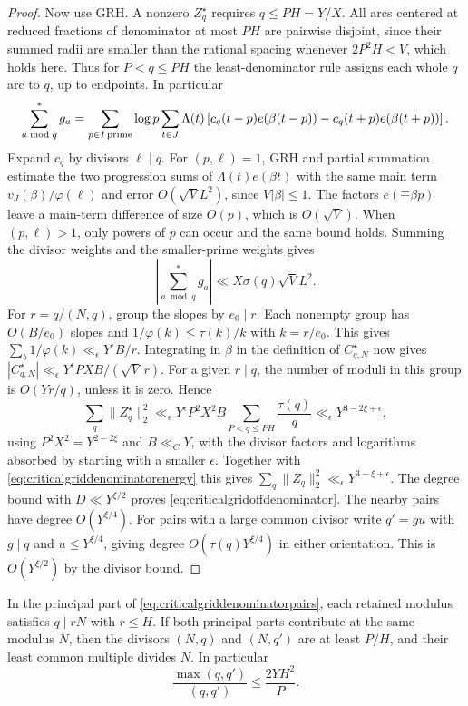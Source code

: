 \documentclass[11pt,a4paper]{article}
\numberwithin{equation}{section}
\begin{document}
\begin{proof}
Now use GRH. A nonzero $Z_q^\star$ requires $q\le PH=Y/X$.
All arcs centered at reduced fractions of denominator
at most $PH$ are pairwise disjoint, since their summed
radii are smaller than the rational spacing whenever
$2P^2H<V$, which holds here. Thus for $P<q\le PH$
the least-denominator rule assigns each whole $q$ arc to
$q$, up to endpoints. In particular
\[
 \sum_{a\bmod q}^{*}g_a
  =\sum_{p\in I\,{\rm prime}}\log p
     \sum_{t\in J}\Lambda(t)\left[
       c_q(t-p)e(\beta(t-p))-c_q(t+p)e(\beta(t+p))\right].
\]
Expand $c_q$ by divisors $\ell\mid q$. For $(p,\ell)=1$,
GRH and partial summation estimate the two progression
sums of $\Lambda(t)e(\beta t)$ with the same main term
$v_J(\beta)/\varphi(\ell)$ and error $O(\sqrt V L^2)$,
since $V|\beta|\le1$. The factors $e(\mp\beta p)$ leave
a main-term difference of size $O(p)$, which is
$O(\sqrt V)$. When $(p,\ell)>1$, only powers of $p$ can
occur and the same bound holds. Summing the divisor
weights and the smaller-prime weights gives
\[
 \left|\sum_{a\bmod q}^{*}g_a\right|
     \ll X\sigma(q)\sqrt V L^2 .
\]
For $r=q/(N,q)$, group the slopes by $e_0\mid r$.
Each nonempty group has $O(B/e_0)$ slopes and
$1/\varphi(k)\le\tau(k)/k$ with $k=r/e_0$. This gives
$\sum_b 1/\varphi(k)\ll_\epsilon Y^\epsilon B/r$.
Integrating in $\beta$ in the definition of $C_{q,N}^\star$
now gives $|C_{q,N}^\star|\ll_\epsilon
Y^\epsilon P X B/(\sqrt V\,r)$. For a given $r\mid q$,
the number of moduli in this group is $O(Yr/q)$, unless it
is zero. Hence
\[
 \sum_q\|Z_q^\star\|_2^2
  \ll_\epsilon Y^\epsilon P^2 X^2 B
       \sum_{P<q\le PH}\frac{\tau(q)}q
  \ll_\epsilon Y^{3-2\xi+\epsilon},
\]
using $P^2X^2=Y^{2-2\xi}$ and $B\ll_C Y$, with the
divisor factors and logarithms absorbed by starting with
a smaller $\epsilon$.
Together with \cref{eq:criticalgriddenominatorenergy}
this gives $\sum_q\|Z_q\|_2^2\ll_\epsilon
Y^{3-\xi+\epsilon}$. The degree bound with
$D\ll Y^{\xi/2}$ proves \cref{eq:criticalgridoffdenominator}.
The nearby pairs have degree $O(Y^{\xi/4})$. For pairs
with a large common divisor write $q'=g u$ with $g\mid q$
and $u\le Y^{\xi/4}$, giving degree $O(\tau(q)Y^{\xi/4})$
in either orientation. This is $O(Y^{\xi/2})$ by the divisor
bound.
\end{proof}

In the principal part of \cref{eq:criticalgriddenominatorpairs},
each retained modulus satisfies $q\mid rN$ with $r\le H$.
If both principal parts contribute at the same modulus $N$,
then the divisors $(N,q)$ and $(N,q')$ are at least $P/H$,
and their least common multiple divides $N$. In particular
\[
 \frac{\max(q,q')}{(q,q')}
 \le \frac{2YH^2}{P}.
\]
\end{document}
